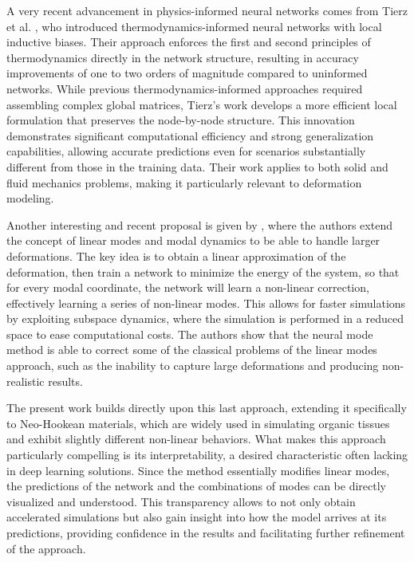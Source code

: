 A very recent advancement in physics-informed neural networks comes from Tierz et al. \cite{Tierz_Alfaro_González_Chinesta_Cueto_2025}, who introduced thermodynamics-informed neural networks with local inductive biases. Their approach enforces the first and second principles of thermodynamics directly in the network structure, resulting in accuracy improvements of one to two orders of magnitude compared to uninformed networks. While previous thermodynamics-informed approaches required assembling complex global matrices, Tierz's work develops a more efficient local formulation that preserves the node-by-node structure. This innovation demonstrates significant computational efficiency and strong generalization capabilities, allowing accurate predictions even for scenarios substantially different from those in the training data. Their work applies to both solid and fluid mechanics problems, making it particularly relevant to deformation modeling.


Another interesting and recent proposal is given by \cite{Wang_Du_Coros_Thomaszewski_2024}, where the authors extend the concept of linear modes and modal dynamics \cite{Pentland_Williams_1989} to be able to handle larger deformations. The key idea is to obtain a linear approximation of the deformation, then train a network to minimize the energy of the system, so that for every modal coordinate, the network will learn a non-linear correction, effectively learning a series of non-linear modes. This allows for faster simulations by exploiting subspace dynamics, where the simulation is performed in a reduced space to ease computational costs. The authors show that the neural mode method is able to correct some of the classical problems of the linear modes approach, such as the inability to capture large deformations and producing non-realistic results. 

The present work builds directly upon this last approach, extending it specifically to Neo-Hookean materials, which are widely used in simulating organic tissues and exhibit slightly different non-linear behaviors. What makes this approach particularly compelling is its interpretability, a desired characteristic often lacking in deep learning solutions. Since the method essentially modifies linear modes, the predictions of the network and the combinations of modes can be directly visualized and understood. This transparency allows to not only obtain accelerated simulations but also gain insight into how the model arrives at its predictions, providing confidence in the results and facilitating further refinement of the approach. 